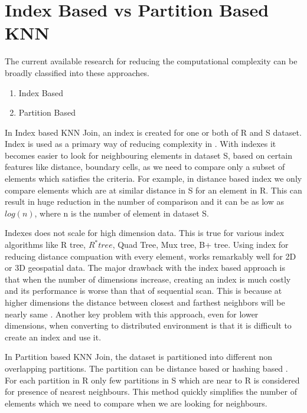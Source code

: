 \bigskip

\section{Index Based vs Partition Based KNN}
The current available research for reducing the computational
complexity can be broadly classified into these approaches.
\begin{enumerate}
\item Index Based
\item Partition Based
\end{enumerate}

\medskip

In Index based KNN Join, an index is created for one or both of R and S
dataset. Index is used as a primary way of reducing complexity in \cite{jagadish_idistance:_2005}
\cite{yu_efficient_2007} \cite{bohm_epsilon_2001}.  With indexes it
becomes easier to look for neighbouring elements in dataset S, based
on certain features like distance, boundary cells,  as we
need to compare only a subset of elements which satisfies the
criteria. For example, in distance based index
\cite{jagadish_idistance:_2005} we only compare elements which are at
similar distance in S for an element in R. This can result in huge
reduction in the number of comparison and it can be as low as $log(n)$, where n is the number of element in
dataset S.

\medskip

Indexes does not scale for high dimension data. This is true for various
index algorithms like R tree, $R^* tree$, Quad Tree, Mux tree, B+
tree. Using index for reducing distance compuation with every element, works
remarkably well for 2D or 3D geospatial data. The major drawback with the
index based approach is that when the number of dimensions increase,
creating an index is much costly and its performance is worse than
that of sequential scan. This is because at higher dimensions the distance
between closest and farthest neighbors will be nearly same
\cite{beyer_when_1999}. Another key problem with this approach, even
for lower dimensions, when
converting to distributed environment is that it is difficult to
create an index and use it.

\bigskip

In Partition based KNN Join, the dataset is partitioned into different
non overlapping partitions. The
partition can be distance based\cite{lu_efficient_2012} or hashing
based \cite{stupar_rankreduceprocessing_2010} \cite{yao_k_2010}. For each partition in R only few partitions in S which are
near to R is considered for presence of nearest neighbours. This
method quickly simplifies the number of elements which we need to
compare when we are looking for neighbours.


